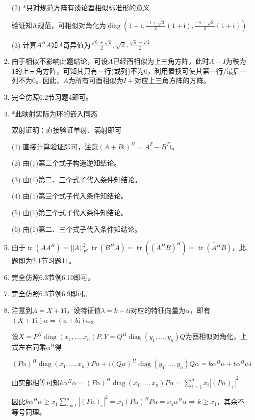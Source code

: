 \documentclass[a4paper,UTF8,fontset=windows]{ctexart}
\DeclareMathOperator{\diag}{diag}
\DeclareMathOperator{\tr}{tr}
\begin{document}
\begin{enumerate}
(2) *只对规范方阵有谈论酉相似标准形的意义

验证知A规范，可相似对角化为$\diag\left(1+\mathrm{i},\frac{-1+\sqrt3}{2}(1+\mathrm{i}),\frac{-1-\sqrt3}{2}(1+\mathrm{i})\right)$

(3) 计算$A^HA$知$A$奇异值为$\frac{\sqrt6+\sqrt2}{2},\sqrt2,\frac{\sqrt6-\sqrt2}{2}$

\item
由于相似不影响此题结论，可设$A$已经酉相似为上三角方阵，此时$A-I$为秩为1的上三角方阵，可知其只有一行(或列)不为0，利用置换可使其第一行/最后一列不为0。因此，$A$为所有可酉相似为$I+$对应上三角方阵的方阵。

\item
完全仿照6.2节习题4即可。

\item
*此映射实际为环的嵌入同态

双射证明：直接验证单射、满射即可

(1) 直接计算验证即可，注意$(A+B\mathrm{i})^H=A^T-B^T\mathrm{i}$。

(2) 由(1)第二个式子构造逆知结论。

(3) 由(1)第二、三个式子代入条件知结论。

(4) 由(1)第三个式子代入条件知结论。

(5) 由(1)第三个式子代入条件知结论。

(6) 由(1)第二、三个式子代入条件知结论。

\item
由于$\tr(AA^H)=||A||_F^2,\tr(B^HA)=\tr((A^HB)^H)=\overline{\tr(A^HB)}$，此题即为2.1节习题11。

\item
完全仿照6.3节例6.10即可。

\item
完全仿照6.3节例6.9即可。

\item
注意到$A=X+Y\mathrm{i}$，设特征值$\lambda=k+t\mathrm{i}$对应的特征向量为$\alpha$，即有$(X+Y\mathrm{i})\alpha=(a+b\mathrm{i})\alpha$。

设$X=P^H\diag(x_1,\dots,x_n)P,Y=Q^H\diag(y_1,\dots,y_n)Q$为酉相似对角化，上式左右同乘$\alpha^H$得

$(P\alpha)^H\diag(x_1,\dots,x_n)P\alpha+\mathrm{i}(Q\alpha)^H\diag(y_1,\dots,y_n)Q\alpha=k\alpha^H\alpha+t\alpha^H\alpha\mathrm{i}$

由实部相等可知$k\alpha^H\alpha=(P\alpha)^H\diag(x_1,\dots,x_n)P\alpha=\sum_{i=1}^{n}x_i|(P\alpha)_i|^2$

因此$k\alpha^H\alpha\ge x_1\sum_{i=1}^{n}{|(P\alpha)_i|^2}=x_1(P\alpha)^HP\alpha=x_1\alpha^H\alpha\Rightarrow k\ge x_1$，其余不等号同理。


\end{enumerate}
\end{document}
